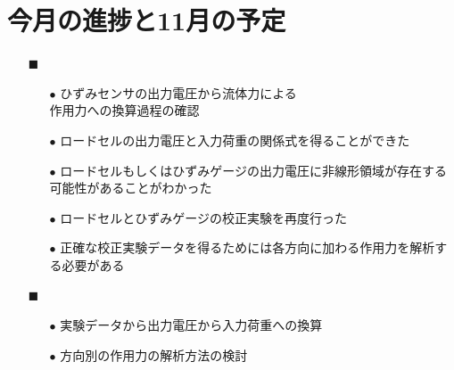 \documentclass[twocolumn,a4j]{jsarticle}
\begin{document}
\newpage
\section{今月の進捗と11月の予定}
\begin{itemize}
    \item [$\blacksquare$] 
          \begin{itemize}
              \item [$\bullet$] ひずみセンサの出力電圧から流体力による\\
                    作用力への換算過程の確認
              \item [$\bullet$] ロードセルの出力電圧と入力荷重の関係式を得ることができた
              \item [$\bullet$] ロードセルもしくはひずみゲージの出力電圧に非線形領域が存在する可能性があることがわかった
              \item [$\bullet$] ロードセルとひずみゲージの校正実験を再度行った
              \item [$\bullet$] 正確な校正実験データを得るためには各方向に加わる作用力を解析する必要がある\\
          \end{itemize}
    \item [$\blacksquare$] 
          \begin{itemize}
              \item [$\bullet$] 実験データから出力電圧から入力荷重への換算
              \item [$\bullet$] 方向別の作用力の解析方法の検討\\
          \end{itemize}
\end{itemize}
\end{document}
